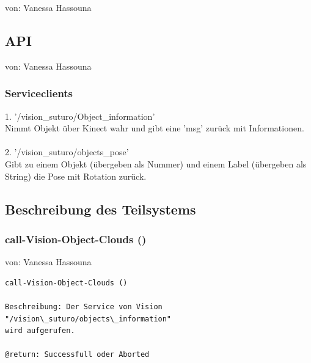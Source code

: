 \documentclass{suturo}
\makeatletter
\newcommand{\chapterauthor}[1]{%
  {\parindent0pt\vspace*{-27pt}%
  \linespread{0}\small\begin{flushright}von: #1\end{flushright}%
  \par\nobreak\vspace*{0pt}}
  \@afterheading%
}
\makeatother
\begin{document}
\chapterauthor{Vanessa Hassouna}



\begin{figure}[!htb]
\end{figure}




\subsection{API}
\chapterauthor{Vanessa Hassouna}
\subsubsection{Serviceclients}
1. '/vision\_suturo/Object\_information' \\
Nimmt Objekt über Kinect wahr und gibt eine 'msg' zurück mit Informationen.\\ \\
2. '/vision\_suturo/objects\_pose' \\
Gibt zu einem Objekt (übergeben als Nummer) und einem Label (übergeben als String) die Pose mit Rotation zurück.

\subsection{Beschreibung des Teilsystems}




\subsubsection{call-Vision-Object-Clouds ()}
\chapterauthor{Vanessa Hassouna}
\begin{verbatim}
call-Vision-Object-Clouds ()

Beschreibung: Der Service von Vision "/vision\_suturo/objects\_information"
wird aufgerufen.

@return: Successfull oder Aborted
\end{verbatim}
\end{document}
